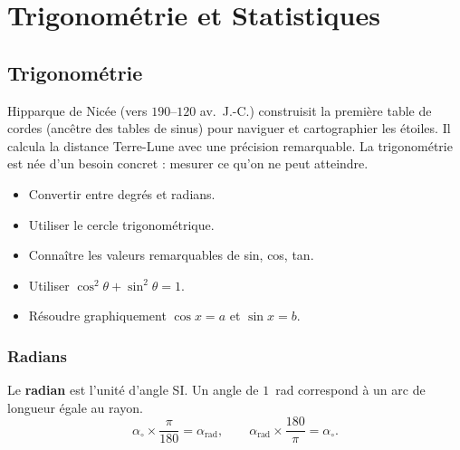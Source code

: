 \part{Trigonom\'etrie et Statistiques}

\chapter{Trigonom\'etrie}


\begin{anecdote}
Hipparque de Nic\'ee (vers $190$--$120$ av.\ J.-C.) construisit la premi\`ere
table de cordes (anc\^{e}tre des tables de sinus) pour naviguer et cartographier
les \'etoiles. Il calcula la distance Terre-Lune avec une pr\'ecision remarquable.
La trigonom\'etrie est n\'ee d'un besoin concret : mesurer ce qu'on ne peut atteindre.
\end{anecdote}

\begin{objectifs}
\begin{itemize}
  \item Convertir entre degr\'es et radians.
  \item Utiliser le cercle trigonom\'etrique.
  \item Conna\^itre les valeurs remarquables de sin, cos, tan.
  \item Utiliser $\cos^2\theta + \sin^2\theta = 1$.
  \item R\'esoudre graphiquement $\cos x = a$ et $\sin x = b$.
\end{itemize}
\end{objectifs}

\section{Radians}

\begin{defn}[Radian]
Le \textbf{radian} est l'unit\'e d'angle SI. Un angle de $1$~rad correspond
\`a un arc de longueur \'egale au rayon.
$$\alpha_\circ \times \frac{\pi}{180} = \alpha_\text{rad},\qquad
  \alpha_\text{rad} \times \frac{180}{\pi} = \alpha_\circ.$$
\end{defn}

